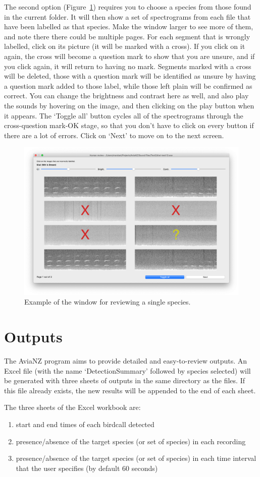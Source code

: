 \documentclass{article}
\begin{document}
The second option (Figure~\ref{check2}) requires you to choose a species from those found in the current folder. It will then show a set of spectrograms from each file that have been labelled as that species. Make the window larger to see more of them, and note there there could be multiple pages. For each segment that is wrongly labelled, click on its picture (it will be marked with a cross). If you click on it again, the cross will become a question mark to show that you are unsure, and if you click again, it will return to having no mark. Segments marked with a cross will be deleted, those with a question mark will be identified as unsure by having a question mark added to those label, while those left plain will be confirmed as correct.  You can change the brightness and contrast here as well, and also play the sounds by hovering on the image, and then clicking on the play button when it appears. The `Toggle all' button cycles all of the spectrograms through the cross-question mark-OK stage, so that you don't have to click on every button if there are a lot of errors. Click on `Next' to move on to the next screen. 

	\begin{figure}
	\centering
	\includegraphics[width=.4\textwidth]{Figs/review2}
	\caption{Example of the window for reviewing a single species.}
	\label{check2}
	\end{figure}

\section{Outputs}
\label{sec:outputs}

The AviaNZ program aims to provide detailed and easy-to-review outputs. An Excel file (with the name `DetectionSummary' followed by species selected) will be generated with three sheets of outputs in the same directory as the files. If this file already exists, the new results will be appended to the end of each sheet. 

The three sheets of the Excel workbook are:
\begin{enumerate}
\item start and end times of each birdcall detected
\item presence/absence of the target species (or set of species) in each recording
\item  presence/absence of the target species (or set of species) in each time interval that the user specifies (by default 60 seconds)
\end{enumerate}
\end{document}
